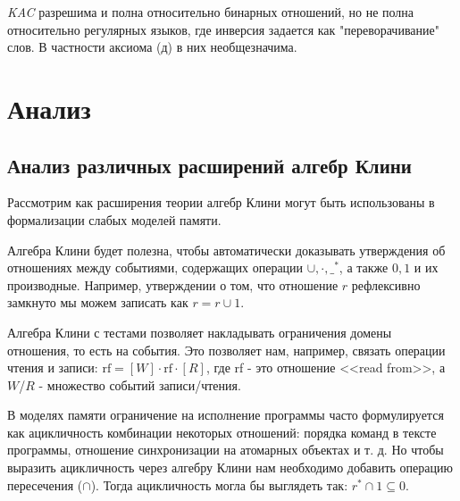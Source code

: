 \documentclass[times
              ]{itmo-student-thesis}
\begin{document}
    \textit{KAC} разрешима и полна относительно бинарных отношений, но не полна относительно регулярных языков, где инверсия задается как "переворачивание" слов.
    В частности аксиома (д) в них необщезначима.


  \section{Анализ}


  \subsection{Анализ различных расширений алгебр Клини}
    Рассмотрим как расширения теории алгебр Клини могут быть использованы в формализации слабых моделей памяти.

    Алгебра Клини будет полезна, чтобы автоматически доказывать утверждения об отношениях между событиями,
    содержащих операции $ \cup, \cdot, \_^* $, а также $0, 1 $ и их производные.
    Например, утверждении о том, что отношение $ r $ рефлексивно замкнуто мы можем записать как $ r = r \cup 1 $.

    Алгебра Клини с тестами позволяет накладывать ограничения домены отношения, то есть на события. Это позволяет нам, например, связать операции чтения и записи:
    $ \text{rf} = [W] \cdot \text{rf} \cdot [R] $,
      где rf - это отношение <<read from>>,
      а $W$/$R$ - множество событий записи/чтения.


    В моделях памяти ограничение на исполнение программы часто формулируется как ацикличность комбинации некоторых отношений: порядка команд в тексте программы, отношение синхронизации на атомарных объектах и т. д.
    Но чтобы выразить ацикличность через алгебру Клини нам необходимо добавить операцию пересечения ($\cap$).
    Тогда ацикличность могла бы выглядеть так: $ r^* \cap 1 \subseteq 0 $.
\end{document}
